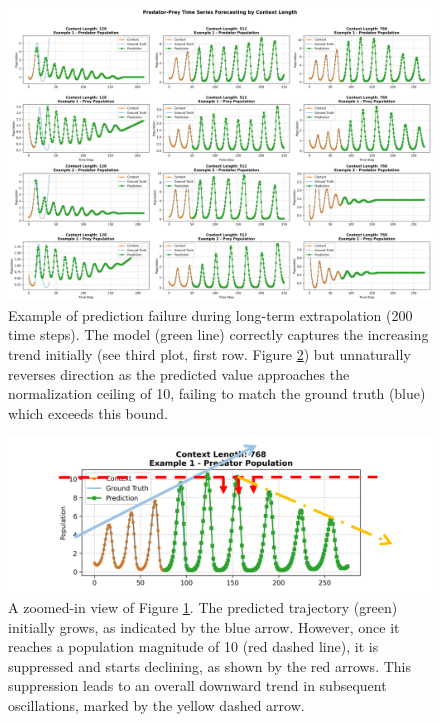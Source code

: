 \documentclass{article}
\begin{document}
\begin{figure}[!htbp] %
    \centering
    \includegraphics[width=0.9\linewidth]{M2 Course Work//Images/problem_long_sequence.png} %
    \caption{Example of prediction failure during long-term extrapolation (200 time steps). The model (green line) correctly captures the increasing trend initially (see third plot, first row. Figure \ref{fig:zoomed-up-sequence}) but unnaturally reverses direction as the predicted value approaches the normalization ceiling of 10, failing to match the ground truth (blue) which exceeds this bound.}
    \label{fig:long_term_prediction_failure} %
\end{figure}

\begin{figure}[!htbp]
    \centering
    \includegraphics[width=0.75\linewidth]{M2 Course Work//Images/zoomed_up_sequence.png}
    \caption{A zoomed-in view of Figure \ref{fig:long_term_prediction_failure}. The predicted trajectory (green) initially grows, as indicated by the blue arrow. However, once it reaches a population magnitude of 10 (red dashed line), it is suppressed and starts declining, as shown by the red arrows. This suppression leads to an overall downward trend in subsequent oscillations, marked by the yellow dashed arrow.}
    \label{fig:zoomed-up-sequence}
\end{figure}
\end{document}
